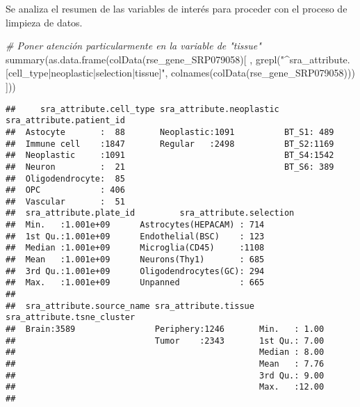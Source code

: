 \documentclass[
]{article}
\newenvironment{Shaded}{\begin{snugshade}}{\end{snugshade}}
\newcommand{\CommentTok}[1]{\textcolor[rgb]{0.56,0.35,0.01}{\textit{#1}}}
\newcommand{\FunctionTok}[1]{\textcolor[rgb]{0.00,0.00,0.00}{#1}}
\newcommand{\NormalTok}[1]{#1}
\newcommand{\StringTok}[1]{\textcolor[rgb]{0.31,0.60,0.02}{#1}}
\begin{document}
Se analiza el resumen de las variables de interés para proceder con el
proceso de limpieza de datos.

\begin{Shaded}
\begin{Highlighting}[]
\CommentTok{\# Poner atención particularmente en la variable de "tissue"}
\FunctionTok{summary}\NormalTok{(}\FunctionTok{as.data.frame}\NormalTok{(}\FunctionTok{colData}\NormalTok{(rse\_gene\_SRP079058)[}
\NormalTok{  ,}
  \FunctionTok{grepl}\NormalTok{(}\StringTok{"\^{}sra\_attribute.[cell\_type|neoplastic|selection|tissue]"}\NormalTok{, }\FunctionTok{colnames}\NormalTok{(}\FunctionTok{colData}\NormalTok{(rse\_gene\_SRP079058)))}
\NormalTok{]))}
\end{Highlighting}
\end{Shaded}

\begin{verbatim}
##     sra_attribute.cell_type sra_attribute.neoplastic sra_attribute.patient_id
##  Astocyte       :  88       Neoplastic:1091          BT_S1: 489              
##  Immune cell    :1847       Regular   :2498          BT_S2:1169              
##  Neoplastic     :1091                                BT_S4:1542              
##  Neuron         :  21                                BT_S6: 389              
##  Oligodendrocyte:  85                                                        
##  OPC            : 406                                                        
##  Vascular       :  51                                                        
##  sra_attribute.plate_id         sra_attribute.selection
##  Min.   :1.001e+09      Astrocytes(HEPACAM) : 714      
##  1st Qu.:1.001e+09      Endothelial(BSC)    : 123      
##  Median :1.001e+09      Microglia(CD45)     :1108      
##  Mean   :1.001e+09      Neurons(Thy1)       : 685      
##  3rd Qu.:1.001e+09      Oligodendrocytes(GC): 294      
##  Max.   :1.001e+09      Unpanned            : 665      
##                                                        
##  sra_attribute.source_name sra_attribute.tissue sra_attribute.tsne_cluster
##  Brain:3589                Periphery:1246       Min.   : 1.00             
##                            Tumor    :2343       1st Qu.: 7.00             
##                                                 Median : 8.00             
##                                                 Mean   : 7.76             
##                                                 3rd Qu.: 9.00             
##                                                 Max.   :12.00             
## 
\end{verbatim}
\end{document}
